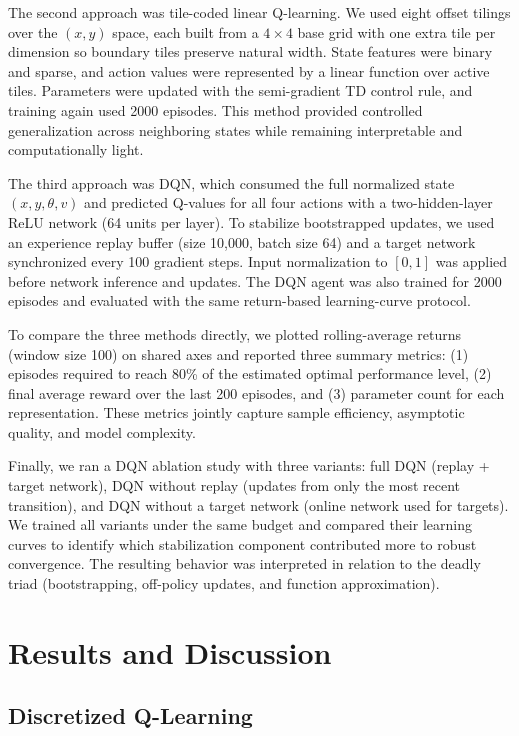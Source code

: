 \documentclass[10pt,twocolumn]{article}
\begin{document}
The second approach was tile-coded linear Q-learning. We used eight offset tilings over the $(x,y)$ space, each built from a $4 \times 4$ base grid with one extra tile per dimension so boundary tiles preserve natural width. State features were binary and sparse, and action values were represented by a linear function over active tiles. Parameters were updated with the semi-gradient TD control rule, and training again used 2000 episodes. This method provided controlled generalization across neighboring states while remaining interpretable and computationally light.

The third approach was DQN, which consumed the full normalized state $(x,y,\theta,v)$ and predicted Q-values for all four actions with a two-hidden-layer ReLU network (64 units per layer). To stabilize bootstrapped updates, we used an experience replay buffer (size 10,000, batch size 64) and a target network synchronized every 100 gradient steps. Input normalization to $[0,1]$ was applied before network inference and updates. The DQN agent was also trained for 2000 episodes and evaluated with the same return-based learning-curve protocol.

To compare the three methods directly, we plotted rolling-average returns (window size 100) on shared axes and reported three summary metrics: (1) episodes required to reach 80\% of the estimated optimal performance level, (2) final average reward over the last 200 episodes, and (3) parameter count for each representation. These metrics jointly capture sample efficiency, asymptotic quality, and model complexity.

Finally, we ran a DQN ablation study with three variants: full DQN (replay + target network), DQN without replay (updates from only the most recent transition), and DQN without a target network (online network used for targets). We trained all variants under the same budget and compared their learning curves to identify which stabilization component contributed more to robust convergence. The resulting behavior was interpreted in relation to the deadly triad (bootstrapping, off-policy updates, and function approximation).

\section{Results and Discussion}

\subsection{Discretized Q-Learning}
\end{document}
